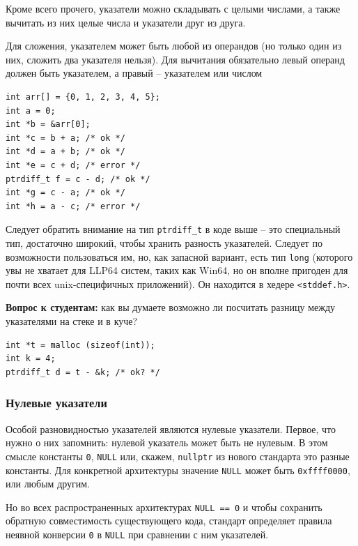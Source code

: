 \documentclass[a4paper,12pt,oneside]{article}
\newif\ifanswers
\begin{document}
Кроме всего прочего, указатели можно складывать с целыми числами, а также вычитать из них целые числа и указатели друг из друга.

Для сложения, указателем может быть любой из операндов (но только один из них, сложить два указателя нельзя). Для вычитания обязательно левый операнд должен быть указателем, а правый -- указателем или числом

\begin{lstlisting}
int arr[] = {0, 1, 2, 3, 4, 5};
int a = 0; 
int *b = &arr[0];
int *c = b + a; /* ok */
int *d = a + b; /* ok */
int *e = c + d; /* error */
ptrdiff_t f = c - d; /* ok */
int *g = c - a; /* ok */
int *h = a - c; /* error */
\end{lstlisting}

Следует обратить внимание на тип \lstinline!ptrdiff_t! в коде выше -- это специальный тип, достаточно широкий, чтобы хранить разность указателей. Следует по возможности пользоваться им, но, как запасной вариант, есть тип \lstinline!long! (которого увы не хватает для LLP64 систем, таких как Win64, но он вполне пригоден для почти всех unix-специфичных приложений). Он находится в хедере \lstinline!<stddef.h>!.

\textbf{Вопрос к студентам:} как вы думаете возможно ли посчитать разницу между указателями на стеке и в куче?

\begin{lstlisting}
int *t = malloc (sizeof(int));
int k = 4;
ptrdiff_t d = t - &k; /* ok? */
\end{lstlisting}

\ifanswers
Правильный ответ: разумеется да, адресная арифметика по стандарту прозрачна относительно того где расположена память до тех пор, пока все влезает в \lstinline!ptrdiff_t!.
\fi

\subsubsection{Нулевые указатели}\label{NullPointers}

Особой разновидностью указателей являются нулевые указатели. Первое, что нужно о них запомнить: нулевой указатель может быть не нулевым. В этом смысле константы \lstinline!0!, \lstinline!NULL! или, скажем, \lstinline!nullptr! из нового стандарта это разные константы. Для конкретной архитектуры значение \lstinline!NULL! может быть \lstinline!0xffff0000!, или любым другим.

Но во всех распространенных архитектурах \lstinline!NULL == 0! и чтобы сохранить обратную совместимость существующего кода, стандарт определяет правила неявной конверсии \lstinline!0! в \lstinline!NULL! при сравнении с ним указателей.
\end{document}

